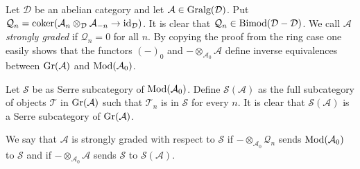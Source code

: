 \documentclass{amsproc}
\def\Ascr{{\mathcal A}}
\def\Dscr{{\mathcal D}}
\def\Qscr{{\mathcal Q}}
\def\Sscr{{\mathcal S}}
\def\Tscr{{\mathcal T}}
\def\Id{\text{id}}
\def\Mod{\mathop{\text{Mod}}}
\def\Bimod{\mathop{\text{Bimod}}}
\def\Gr{\mathop{\text{Gr}}}
\def\Gralg{\mathop{\text{Gralg}}}
\def\coker{\operatorname {coker}}
\def\r{\rightarrow}
\let\oldtext\text
\def\text#1{\oldtext{\upshape #1}}
\theoremstyle{definition}
\theoremstyle{remark}
\numberwithin{equation}{section}
\numberwithin{table}{section}
\numberwithin{figure}{section}
\def\Gr{\mathop{\text{Gr}}}
\begin{document}
Let $\Dscr$ be an abelian category and let $\Ascr\in\Gralg(\Dscr)$.
Put $\Qscr_n=\coker (\Ascr_n\otimes_\Dscr\Ascr_{-n}\r \Id_\Dscr)$. It is
clear that $\Qscr_n\in\Bimod(\Dscr-\Dscr)$. We call $\Ascr$
\emph{strongly graded} if $\Qscr_n=0$ for all $n$. By copying the proof
from the ring case \cite[Thm. I.3.4]{NVO} one easily shows that the
functors $(-)_0$ and $-\otimes_{\Ascr_0}\Ascr$ define inverse
equivalences between $\Gr(\Ascr)$ and $\Mod(\Ascr_0)$.

Let $\Sscr$ be as Serre subcategory of $\Mod(\Ascr_0)$. Define
$\Sscr(\Ascr)$  as the full subcategory of objects $\Tscr$ in $\Gr(\Ascr)$
such that $\Tscr_n$ is in $\Sscr$ for every $n$. It is clear that
$\Sscr(\Ascr)$ is a Serre subcategory of $\Gr(\Ascr)$.

We say that $\Ascr$ is
strongly graded with respect to $\Sscr$ if $-\otimes_{\Ascr_0}\Qscr_n$
sends $\Mod(\Ascr_0)$ to $\Sscr$ and if 
$-\otimes_{\Ascr_0}\Ascr$ sends $\Sscr$ to $\Sscr(\Ascr)$. 
\end{document}
